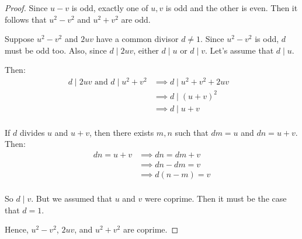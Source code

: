 \documentclass[letterpaper, 12pt, oneside]{memoir}
\theoremstyle{mystyle}
\begin{document}
\begin{proof}
    Since $u-v$ is odd, exactly one of $u,v$ is odd and the other is even. Then 
    it follows that $u^2-v^2$ and $u^2+v^2$ are odd.

    Suppose $u^2-v^2$ and $2uv$ have a common divisor $d \neq 1$. Since
    $u^2-v^2$ is odd, $d$ must be odd too. Also, since $d \mid 2uv$, either
    $d \mid u$ or $d \mid v$. Let's assume that $d \mid u$.

    Then:
    \begin{align*}
    d \mid 2uv \text{ and } d \mid u^2+v^2  &\implies d \mid u^2+v^2 + 2uv & \\
                                            &\implies d \mid (u+v)^2 \\
                                            &\implies d \mid u+v \\
    \end{align*}

    If $d$ divides $u$ and $u+v$, then there exists $m,n$ such that $dm = u$ and
    $dn = u+v$. Then:
    \begin{align*}
    dn = u+v    &\implies dn = dm+v \\
                &\implies dn-dm = v \\
                &\implies d(n-m) = v \\
    \end{align*}

    So $d \mid v$. But we assumed that $u$ and $v$ were coprime. Then it must
    be the case that $d=1$.

    Hence, $u^2-v^2$, $2uv$, and  $u^2+v^2$ are coprime.
\end{proof}
\end{document}
